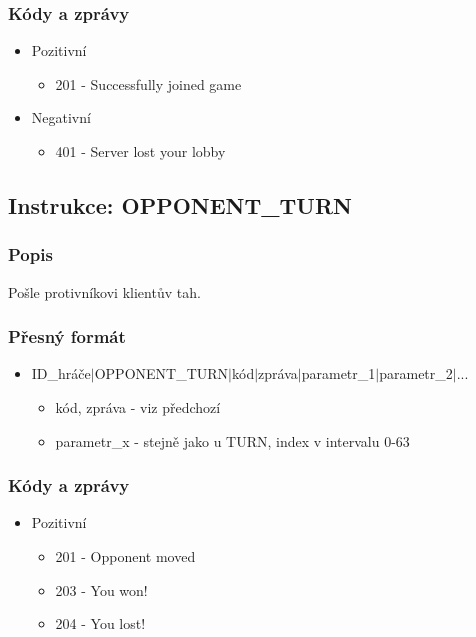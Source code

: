 \documentclass[12pt]{report}
\begin{document}
\subsubsection{Kódy a zprávy}
\begin{itemize}
	\item Pozitivní
		\begin{itemize}
			\item 201 - Successfully joined game
		\end{itemize}
	\item Negativní
		\begin{itemize}
			\item 401 - Server lost your lobby
		\end{itemize}

\end{itemize}
%
%
%
\subsection{Instrukce: OPPONENT\_TURN}
\subsubsection{Popis}
Pošle protivníkovi klientův tah.

\subsubsection{Přesný formát}
\begin{itemize}
	\item ID\_hráče$|$OPPONENT\_TURN$|$kód$|$zpráva$|$parametr\_1$|$parametr\_2$|$...
	\begin{itemize}
			\item kód, zpráva - viz předchozí
			\item parametr\_x - stejně jako u TURN, index v intervalu 0-63
	\end{itemize}

\end{itemize}

\subsubsection{Kódy a zprávy}
\begin{itemize}
	\item Pozitivní
		\begin{itemize}
			\item 201 - Opponent moved
			\item 203 - You won!
			\item 204 - You lost!
		\end{itemize}
\end{itemize}
%
%
%
\end{document}
